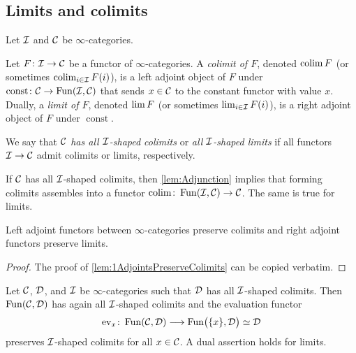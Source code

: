 \subsection{Limits and colimits}
\begin{defi}\label{def:Colimits}
	Let $\mathcal{I}$ and $\mathcal{C}$ be $\infty$-categories.
	\begin{alphanumerate}
		\item Let $F\colon \mathcal{I}\rightarrow \mathcal{C}$ be a functor of $\infty$-categories. A \emph{colimit of $F$}, denoted $\operatorname*{colim} F$ (or sometimes $\operatorname*{colim}_{i\in\mathcal{I}}F(i)$), is a left adjoint object of $F$ under  $\operatorname{const}\colon\mathcal{C}\rightarrow \operatorname{Fun}(\mathcal{I},\mathcal{C})$ that sends $x\in\mathcal{C}$ to the constant functor with value $x$. Dually, a \emph{limit of $F$}, denoted $\operatorname*{lim} F$ (or sometimes $\operatorname*{lim}_{i\in\mathcal{I}}F(i)$), is a right adjoint object of $F$ under $\operatorname{const}$.\label{enum:Colimit}
		\item We say that \emph{$\mathcal{C}$ has all $\mathcal{I}$-shaped colimits} or \emph{all $\mathcal{I}$-shaped limits} if all functors $\mathcal{I}\rightarrow \mathcal{C}$ admit colimits or limits, respectively.\label{enum:ColimitFunctor}
	\end{alphanumerate}
\end{defi}
\begin{rem}\label{rem:ColimitFunctor}
	 If $\mathcal{C}$ has all $\mathcal{I}$-shaped colimits, then \cref{lem:Adjunction} implies that forming colimits assembles into a functor $\operatorname*{colim}\colon \operatorname{Fun}(\mathcal{I},\mathcal{C})\rightarrow \mathcal{C}$. The same is true for limits.
\end{rem}
\begin{lem}\label{lem:AdjointsPreserveColimits}
	Left adjoint functors between $\infty$-categories preserve colimits and right adjoint functors preserve limits.
\end{lem}
\begin{proof}
	The proof of \cref{lem:1AdjointsPreserveColimits} can be copied verbatim.
\end{proof}
\begin{lem}\label{lem:ColimitsInFunctorCategories}
	Let $\mathcal{C}$, $\mathcal{D}$, and $\mathcal{I}$ be $\infty$-categories such that $\mathcal{D}$ has all $\mathcal{I}$-shaped colimits. Then $\operatorname{Fun}(\mathcal{C},\mathcal{D})$ has again all $\mathcal{I}$-shaped colimits and the evaluation functor 
	\begin{equation*}
		\operatorname{ev}_x\colon \operatorname{Fun}(\mathcal{C},\mathcal{D})\longrightarrow \operatorname{Fun}\bigl(\{x\},\mathcal{D}\bigr)\simeq \mathcal{D}
	\end{equation*}
	preserves $\mathcal{I}$-shaped colimits for all $x\in \mathcal{C}$. A dual assertion holds for limits.
\end{lem}
